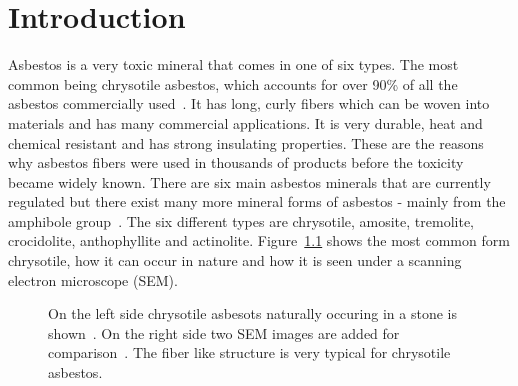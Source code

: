 \chapter{Introduction}

Asbestos is a very toxic mineral that comes in one of six types. The most common being chrysotile asbestos, which accounts for over 90\% of all the asbestos commercially used~\cite{asbestosMaacenter}. It has long, curly fibers which can be woven into materials and has many commercial applications. It is very durable, heat and chemical resistant and has strong insulating properties. These are the reasons why asbestos fibers were used in thousands of products before the toxicity became widely known. There are six main asbestos minerals that are currently regulated but there exist many more mineral forms of asbestos - mainly from the amphibole group~\cite{environmental2008framework}. The six different types are chrysotile, amosite, tremolite, crocidolite, anthophyllite and actinolite. Figure~\ref{fig:chrysotile} shows the most common form chrysotile, how it can occur in nature and how it is seen under a scanning electron microscope (SEM). \\

\begin{figure}[h]
\centering
\caption{On the left side chrysotile asbesots naturally occuring in a stone is shown~\cite{chrysoltileFullSizeImage}. On the right side two SEM images are added for comparison~\cite{mohammed2015}. The fiber like structure is very typical for chrysotile asbestos.}
\label{fig:chrysotile}
\end{figure}

\quad

